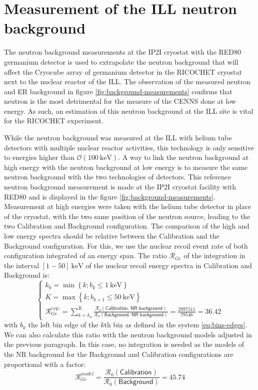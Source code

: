 \section{Measurement of the ILL neutron background}
\label{par:ill-neutron-background}

The neutron background measurements at the IP2I cryostat with the RED80 germanium detector is used to extrapolate the neutron background that will affect the Cryocube array of germanium detector in the RICOCHET cryostat next to the nuclear reactor of the ILL. The observation of the measured neutron and ER background in figure \ref{fig:background-measurements} confirms that neutron is the most detrimental  for the measure of the CENNS done at low energy. As such, an estimation of this neutron background at the ILL site is vital for the RICOCHET experiment.

While the neutron background was measured at the ILL with helium tube detectors with multiple nuclear reactor activities, this technology is only sensitive to energies higher than $\mathcal{O}(\SI{100}{\kilo\eV})$. A way to link the neutron background at high energy with the neutron background at low energy is to measure the same neutron background with the two technologies of detectors. This reference neutron background measurement is made at the IP2I cryostat facility with RED80 and is displayed in the figure \ref{fig:background-measurements}. Measurement at high energies were taken with the helium tube detector in place of the cryostat, with the two same position of the neutron source, leading to the two Calibration and Background configuration. The comparison of the high and low energy spectra should be relative between the Calibration and the Background configuration. For this, we use the nuclear recoil event rate of both configuration integrated of an energy span. The ratio $\mathcal{R}_{Ge}$ of the integration in the interval $[1-50]\ \si{\kilo\eV}$ of the nuclear recoil energy spectra in Calibration and Background is:
\begin{equation}
\begin{cases}
\displaystyle k_0 = \min \left\lbrace k; b_k \leq \SI{1}{\kilo\eV} \right\rbrace
\\
\displaystyle K = \max \left\lbrace k; b_{k+1} \leq \SI{50}{\kilo\eV} \right\rbrace
\\
\displaystyle \mathcal{R}_{Ge}^{exp.} = 
\sum_{k=k_0}^K 
\frac{
\mathcal{R}_k(\textsf{Calibration, NR background}) 
}{
\mathcal{R}_k(\textsf{Background, NR background}) 
}
=
\frac{ 2897511 }{ 79546 }
= 36.42
\end{cases}
\end{equation}
with $b_k$ the left bin edge of the $k$th bin as defined in the system \ref{eq:bins-edges}. We can also calculate this ratio with the neutron background models adjusted in the previous paragraph. In this case, no integration is needed as the models of the NR background for the Background and Calibration configurations are proportional with a factor:
\begin{equation}
\mathcal{R}_{Ge}^{model} = \frac{\mathcal{R}_0(\textsf{Calibration})}{\mathcal{R}_0(\textsf{Background})} = 45.74
\end{equation}

